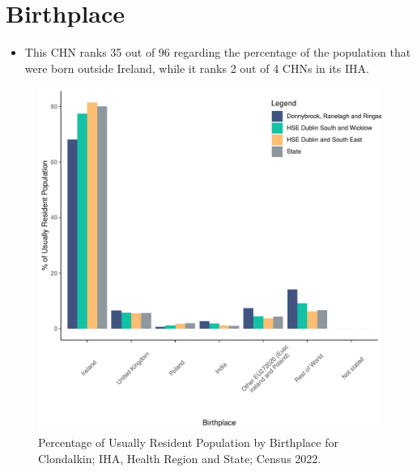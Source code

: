 \documentclass{article}
\begin{document}
\section{Birthplace}\label{sect:Birth}
\begin{itemize}
\item This CHN ranks  35 out of 96 regarding the percentage of the population that were born outside Ireland, while it ranks  2 out of 4 CHNs in its IHA.
\end{itemize}
\begin{figure}[H]
	\centering
	\includegraphics[width = 130mm]{../figures/BirthED.pdf}
	\caption{Percentage of Usually Resident Population by Birthplace for Clondalkin; IHA, Health Region and State; Census 2022.}
	\label{fig:vbnv}
	\end{figure}
	
\end{document}
